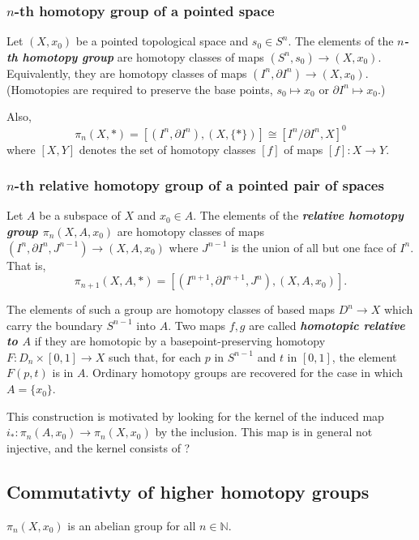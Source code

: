 \subsubsection{\texorpdfstring{$n$}{n}-th homotopy group of a pointed space}

\begin{defn}
	Let $(X,x_0)$ be a pointed topological space and $s_0\in S^n$. The elements of the \textbf{\textit{$n$-th homotopy group}} are homotopy classes of maps $(S^n,s_0)\to (X,x_0)$. Equivalently, they are homotopy classes of maps $(I^n,\partial I^n)\to (X,x_0)$. (Homotopies are required to preserve the base points, $s_0\mapsto x_0$ or $\partial I^n\mapsto x_0$.)
		
	Also,
	\[\pi_n(X,*)=[(I^n,\partial I^n),(X,\{*\})]\cong[I^n/\partial I^n,X]^0\]
	where $[X,Y]$ denotes the set of homotopy classes $[f]$ of maps $[f]:X\to Y$.
\end{defn}

\subsubsection{\texorpdfstring{$n$}{n}-th relative homotopy group of a pointed pair of spaces}
Let $A$ be a subspace of $X$ and $x_0\in A$. The elements of the \textbf{\textit{relative homotopy group $\pi_n(X,A,x_0)$}} are homotopy classes of maps $(I^n,\partial I^n,J^{n-1})\to (X,A,x_0)$ where $J^{n-1}$ is the union of all but one face of $I^n$. That is,
		\[\pi_{n+1}(X,A,*)=[(I^{n+1},\partial I^{n+1},J^n),(X,A,x_0)].\]
		
		The elements of such a group are homotopy classes of based maps $D^n\to X$ which carry the boundary $S^{n-1}$ into $A$. Two maps $f,g$ are called \textbf{\textit{homotopic relative to $A$}} if they are homotopic by a basepoint-preserving homotopy $F:D_n\times[0,1]\to X$ such that, for each $p$ in $S^{n-1}$ and $t$ in $[0,1]$, the element $F(p,t)$ is in $A$. Ordinary homotopy groups are recovered for the case in which $A=\{x_0\}$.
\begin{remark}
	This construction is motivated by looking for the kernel of the induced map $i_*:\pi_n(A,x_0)\to\pi_n(X,x_0)$ by the inclusion. This map is in general not injective, and the kernel consists of ?
\end{remark}

\subsection{Commutativty of higher homotopy groups}
\begin{prop}
	$\pi_n(X,x_0)$ is an abelian group for all $n\in\mathbb{N}$.
\end{prop}

